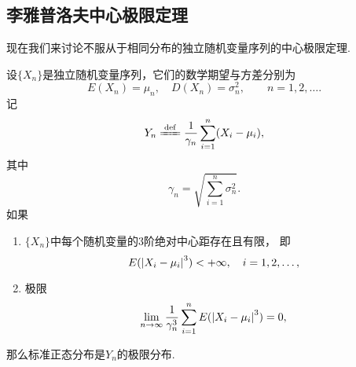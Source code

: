 \subsection{李雅普洛夫中心极限定理}
现在我们来讨论不服从于相同分布的独立随机变量序列的中心极限定理.

\begin{theorem}[李雅普洛夫中心极限定理]
设\(\{X_n\}\)是独立随机变量序列，它们的数学期望与方差分别为\[
	E(X_n) = \mu_n, \quad
	D(X_n) = \sigma_n^2,
	\qquad n=1,2,\dotsc.
\]
记\[
	Y_n \defeq \frac{1}{\gamma_n} \sum_{i=1}^n (X_i-\mu_i),
\]
其中\[
	\gamma_n = \sqrt{\sum_{i=1}^n \sigma_n^2}.
\]
如果\begin{enumerate}
	\item \(\{X_n\}\)中每个随机变量的3阶绝对中心距存在且有限，
	即\[
		E(\abs{X_i-\mu_i}^3) < +\infty,
		\quad i=1,2,\dotsc,
	\]

	\item 极限\[
		\lim_{n\to\infty} \frac{1}{\gamma_n^3}
			\sum_{i=1}^n E(\abs{X_i-\mu_i}^3)
		= 0,
	\]
\end{enumerate}
那么标准正态分布是\(Y_n\)的极限分布.
\end{theorem}
